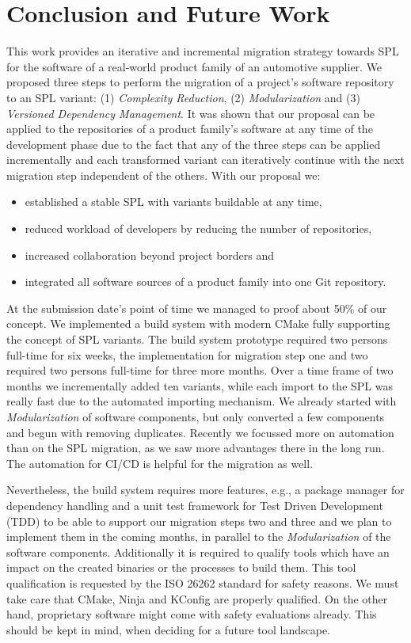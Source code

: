 \section{Conclusion and Future Work}\label{conclusion}

This work provides an iterative and incremental migration strategy towards SPL
for the software of a real-world product family of an automotive supplier. We
proposed three steps to perform the migration of a project's software repository
to an SPL variant: (1) \textit{Complexity Reduction}, (2)
\textit{Modularization} and (3) \textit{Versioned Dependency Management}. It was
shown that our proposal can be applied to the repositories of a product family's
software at any time of the development phase due to the fact that any of the
three steps can be applied incrementally and each transformed variant can
iteratively continue with the next migration step independent of the others.
With our proposal we:

\begin{itemize}
  \item established a stable SPL with variants buildable at any time,
  \item reduced workload of developers by reducing the number of repositories,
  \item increased collaboration beyond project borders and
  \item integrated all software sources of a product family into one Git
        repository.
\end{itemize}

At the submission date's point of time we managed to proof about 50\% of our
concept. We implemented a build system with modern CMake fully supporting the
concept of SPL variants. The build system prototype required two persons
full-time for six weeks, the implementation for migration step one and two
required two persons full-time for three more months. Over a time frame of two
months we incrementally added ten variants, while each import to the SPL was
really fast due to the automated importing mechanism. We already started with
\textit{Modularization} of software components, but only converted a few
components and begun with removing duplicates. Recently we focussed more on
automation than on the SPL migration, as we saw more advantages there in the
long run. The automation for CI/CD is helpful for the migration as well.

Nevertheless, the build system requires more features, e.g., a package manager
for dependency handling and a unit test framework for Test Driven Development
(TDD) to be able to support our migration steps two and three and we plan to
implement them in the coming months, in parallel to the \textit{Modularization}
of the software components. Additionally it is required to qualify tools which
have an impact on the created binaries or the processes to build them. This tool
qualification is requested by the ISO 26262 standard for safety reasons. We must
take care that CMake, Ninja and KConfig are properly qualified. On the other
hand, proprietary software might come with safety evaluations already. This
should be kept in mind, when deciding for a future tool landscape.

